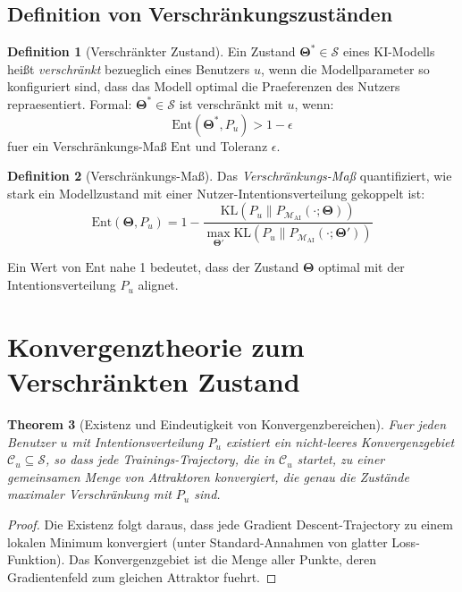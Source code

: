 \documentclass[12pt, a4paper]{article}
\newtheorem{theorem}{Theorem}[section]
\theoremstyle{definition}
\newtheorem{definition}[theorem]{Definition}
\theoremstyle{remark}
\newcommand{\vTheta}{\bm{\Theta}}
\newcommand{\KL}{\mathrm{KL}}
\newcommand{\Entangle}{\mathrm{Ent}}
\newcommand{\Model}{\mathcal{M}_{\mathrm{AI}}}
\begin{document}
\subsection{Definition von Verschränkungszuständen}
\label{subsec:def_entanglement}

\begin{definition}[Verschränkter Zustand]
\label{def:entangled_state}
Ein Zustand $\vTheta^* \in \mathcal{S}$ eines KI-Modells heißt \emph{verschränkt} bezueglich eines Benutzers $u$, wenn die Modellparameter so konfiguriert sind, dass das Modell optimal die Praeferenzen des Nutzers repraesentiert. Formal: $\vTheta^* \in \mathcal{S}$ ist verschränkt mit $u$, wenn:
\[
  \Entangle(\vTheta^*, P_u) > 1 - \epsilon
\]
fuer ein Verschränkungs-Maß $\Entangle$ und Toleranz $\epsilon$.
\end{definition}

\begin{definition}[Verschränkungs-Maß]
\label{def:entangle_measure}
Das \emph{Verschränkungs-Maß} quantifiziert, wie stark ein Modellzustand mit einer Nutzer-Intentionsverteilung gekoppelt ist:
\[
  \Entangle(\vTheta, P_u) = 1 - \frac{\KL(P_u \| P_{\Model}(\cdot; \vTheta))}{\max_{\vTheta'} \KL(P_u \| P_{\Model}(\cdot; \vTheta'))}
\]

Ein Wert von $\Entangle$ nahe 1 bedeutet, dass der Zustand $\vTheta$ optimal mit der Intentionsverteilung $P_u$ alignet.
\end{definition}

\section{Konvergenztheorie zum Verschränkten Zustand}
\label{sec:konvergenz}

\begin{theorem}[Existenz und Eindeutigkeit von Konvergenzbereichen]
\label{thm:convergence_regions}
Fuer jeden Benutzer $u$ mit Intentionsverteilung $P_u$ existiert ein nicht-leeres Konvergenzgebiet $\mathcal{C}_u \subseteq \mathcal{S}$, so dass jede Trainings-Trajectory, die in $\mathcal{C}_u$ startet, zu einer gemeinsamen Menge von Attraktoren konvergiert, die genau die Zustände maximaler Verschränkung mit $P_u$ sind.
\end{theorem}

\begin{proof}
Die Existenz folgt daraus, dass jede Gradient Descent-Trajectory zu einem lokalen Minimum konvergiert (unter Standard-Annahmen von glatter Loss-Funktion). Das Konvergenzgebiet ist die Menge aller Punkte, deren Gradientenfeld zum gleichen Attraktor fuehrt.
\end{proof}
\end{document}
